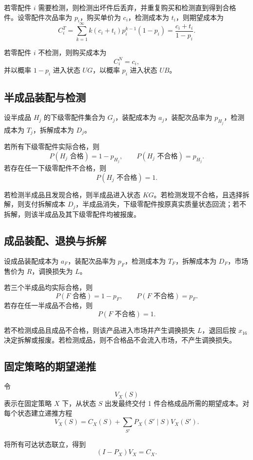 若零配件 \(i\) 需要检测，则检测出坏件后丢弃，并重复购买和检测直到得到合格件。设零配件次品率为 \(p_i\)，购买单价为 \(c_i\)，检测成本为 \(t_i\)，则期望成本为
\[
C_i^{T}
=
\sum_{k=1}^{\infty}k(c_i+t_i)p_i^{k-1}(1-p_i)
=
\frac{c_i+t_i}{1-p_i}.
\]

若零配件 \(i\) 不检测，则购买成本为
\[
C_i^{N}=c_i,
\]
并以概率 \(1-p_i\) 进入状态 \(UG\)，以概率 \(p_i\) 进入状态 \(UB\)。

\subsection{半成品装配与检测}

设半成品 \(H_j\) 的下级零配件集合为 \(G_j\)，装配成本为 \(a_j\)，装配次品率为 \(p_{H_j}\)，检测成本为 \(T_j\)，拆解成本为 \(D_j\)。

若所有下级零配件实际合格，则
\[
P(H_j\text{ 合格})=1-p_{H_j},
\qquad
P(H_j\text{ 不合格})=p_{H_j}.
\]
若存在任一下级零配件不合格，则
\[
P(H_j\text{ 不合格})=1.
\]

若检测半成品且发现合格，则半成品进入状态 \(KG\)。若检测发现不合格，且选择拆解，则支付拆解成本 \(D_j\)，半成品消失，下级零配件按原真实质量状态回流；若不拆解，则该半成品及其下级零配件均被报废。

\subsection{成品装配、退换与拆解}

设成品装配成本为 \(a_F\)，装配次品率为 \(p_F\)，检测成本为 \(T_F\)，拆解成本为 \(D_F\)，市场售价为 \(R\)，调换损失为 \(L\)。

若三个半成品均实际合格，则
\[
P(F\text{ 合格})=1-p_F,
\qquad
P(F\text{ 不合格})=p_F.
\]
若存在任一半成品不合格，则
\[
P(F\text{ 不合格})=1.
\]

若不检测成品且成品不合格，则该产品进入市场并产生调换损失 \(L\)，退回后按 \(x_{16}\) 决定拆解或报废。若检测成品，则不合格品不会流入市场，不产生调换损失。

\subsection{固定策略的期望递推}

令
\[
V_X(S)
\]
表示在固定策略 \(X\) 下，从状态 \(S\) 出发最终交付 1 件合格成品所需的期望成本。对每个状态建立递推方程
\[
V_X(S)
=
C_X(S)
+
\sum_{S'}P_X(S'\mid S)V_X(S').
\]

将所有可达状态联立，得到
\[
(I-P_X)V_X=C_X.
\]

